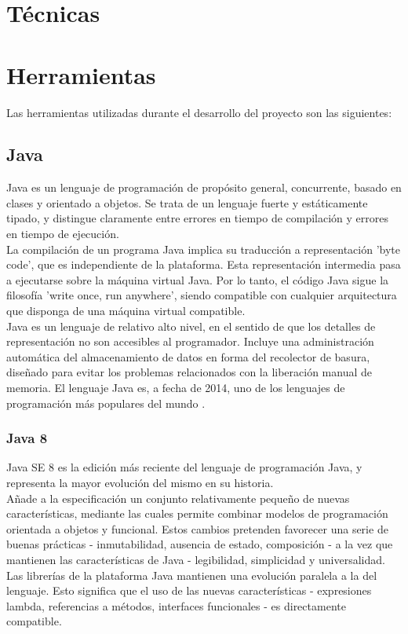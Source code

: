 
\section{Técnicas}


\section{Herramientas}

Las herramientas utilizadas durante el desarrollo del proyecto son las siguientes:

\subsection{Java}

Java es un lenguaje de programación de propósito general, concurrente, basado en clases y orientado a objetos.
Se trata de un lenguaje fuerte y estáticamente tipado, y distingue claramente entre errores en tiempo de compilación y errores en tiempo de ejecución.
\\
La compilación de un programa Java implica su traducción a representación 'byte code', que es independiente de la plataforma.
Esta representación intermedia pasa a ejecutarse sobre la máquina virtual Java.
Por lo tanto, el código Java sigue la filosofía 'write once, run anywhere', siendo compatible con cualquier arquitectura que disponga de una máquina virtual compatible.
\\
Java es un lenguaje de relativo alto nivel, en el sentido de que los detalles de representación no son accesibles al programador.
Incluye una administración automática del almacenamiento de datos en forma del recolector de basura, diseñado para evitar los problemas relacionados con la liberación manual de memoria.
\cite{jls8}
El lenguaje Java es, a fecha de 2014, uno de los lenguajes de programación más populares del mundo \cite{website:tiobe}.

\subsubsection{Java 8}

Java SE 8 es la edición más reciente del lenguaje de programación Java, y representa la mayor evolución del mismo en su historia.
\\
Añade a la especificación un conjunto relativamente pequeño de nuevas características, mediante las cuales permite combinar modelos de programación orientada a objetos y funcional.
Estos cambios pretenden favorecer una serie de buenas prácticas - inmutabilidad, ausencia de estado, composición - a la vez que mantienen las características de Java - legibilidad, simplicidad y universalidad.
\\
Las librerías de la plataforma Java mantienen una evolución paralela a la del lenguaje.
Esto significa que el uso de las nuevas características - expresiones lambda, referencias a métodos, interfaces funcionales - es directamente compatible.
\cite{jls8}

